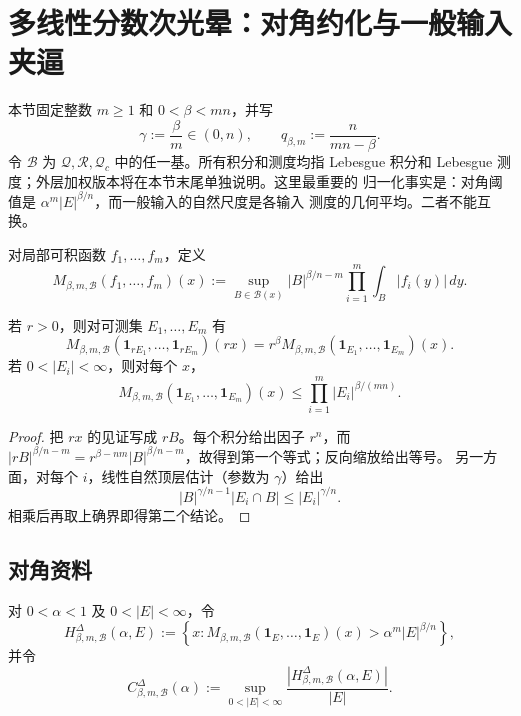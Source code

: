 \section{多线性分数次光晕：对角约化与一般输入夹逼}
\label{sec:multilinear}

本节固定整数 $m\geq 1$ 和 $0<\beta<mn$，并写
\[
 \gamma:=\frac{\beta}{m}\in(0,n),\qquad
 q_{\beta,m}:=\frac{n}{mn-\beta}.
\]
令 $\mathcal B$ 为 $\mathcal Q,\mathcal R,\mathcal Q_c$ 中的任一基。所有积分和测度均指
Lebesgue 积分和 Lebesgue 测度；外层加权版本将在本节末尾单独说明。这里最重要的
归一化事实是：对角阈值是 $\alpha^m|E|^{\beta/n}$，而一般输入的自然尺度是各输入
测度的几何平均。二者不能互换。

\begin{definition}[多线性分数次极大算子]\label{ml:operator}
对局部可积函数 $f_1,\ldots,f_m$，定义
\[
 M_{\beta,m,\mathcal B}(f_1,\ldots,f_m)(x)
 :=\sup_{B\in\mathcal B(x)} |B|^{\beta/n-m}
      \prod_{i=1}^m\int_B |f_i(y)|\,dy .
\]
\end{definition}

\begin{lemma}[共同伸缩与自然顶层]\label{ml:scaling-top}
若 $r>0$，则对可测集 $E_1,\ldots,E_m$ 有
\[
 M_{\beta,m,\mathcal B}(\mathbf1_{rE_1},\ldots,\mathbf1_{rE_m})(rx)
 =r^\beta M_{\beta,m,\mathcal B}(\mathbf1_{E_1},\ldots,\mathbf1_{E_m})(x).
\]
若 $0<|E_i|<\infty$，则对每个 $x$，
\[
 M_{\beta,m,\mathcal B}(\mathbf1_{E_1},\ldots,\mathbf1_{E_m})(x)
 \leq \prod_{i=1}^m |E_i|^{\beta/(mn)}.
\]
\end{lemma}

\begin{proof}
把 $rx$ 的见证写成 $rB$。每个积分给出因子 $r^n$，而
$|rB|^{\beta/n-m}=r^{\beta-nm}|B|^{\beta/n-m}$，故得到第一个等式；反向缩放给出等号。
另一方面，对每个 $i$，线性自然顶层估计（参数为 $\gamma$）给出
\[
 |B|^{\gamma/n-1}|E_i\cap B|\leq |E_i|^{\gamma/n}.
\]
相乘后再取上确界即得第二个结论。
\end{proof}

\subsection{对角资料}

\begin{definition}[对角光晕]\label{ml:diagonal-halo}
对 $0<\alpha<1$ 及 $0<|E|<\infty$，令
\[
 H^{\Delta}_{\beta,m,\mathcal B}(\alpha,E)
 :=\left\{x:
 M_{\beta,m,\mathcal B}(\mathbf1_E,\ldots,\mathbf1_E)(x)
 >\alpha^m|E|^{\beta/n}\right\},
\]
并令
\[
 C^{\Delta}_{\beta,m,\mathcal B}(\alpha)
 :=\sup_{0<|E|<\infty}
 \frac{|H^{\Delta}_{\beta,m,\mathcal B}(\alpha,E)|}{|E|}.
\]
\end{definition}

